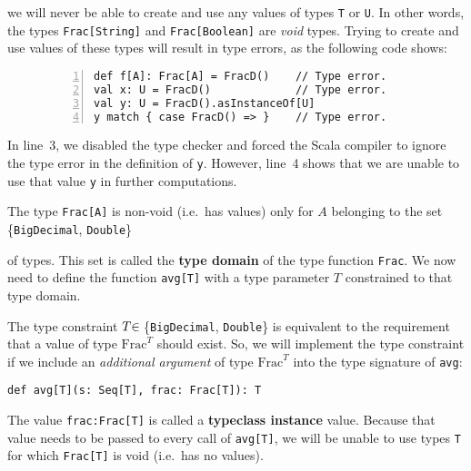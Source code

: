 \noindent we will never be able to create and use any values of types
\lstinline!T! or \lstinline!U!. In other words, the types \lstinline!Frac[String]!
and \lstinline!Frac[Boolean]! are \emph{void} types.
Trying to create and use values of these types will result in type
errors, as the following code shows:

\begin{wrapfigure}{l}{0.46\columnwidth}%
\vspace{-0.95\baselineskip}
\begin{lstlisting}[numbers=left,numberstyle={\small}]
def f[A]: Frac[A] = FracD()    // Type error.
val x: U = FracD()             // Type error.
val y: U = FracD().asInstanceOf[U]
y match { case FracD() => }    // Type error.
\end{lstlisting}

\vspace{-1.05\baselineskip}
\end{wrapfigure}%

\noindent In line~3, we disabled the type checker and forced the
Scala compiler to ignore the type error in the definition of \lstinline!y!.
However, line~4 shows that we are unable to use that value \lstinline!y!
in further computations.

The type \lstinline!Frac[A]! is non-void (i.e.~has values) only
for $A$ belonging to the set \{\lstinline!BigDecimal!, \lstinline!Double!\}
\begin{comment}
$\{\text{BigDecimal},\text{Double}\}$
\end{comment}
{} of types. This set is called the \textbf{type domain}
of the type function \lstinline!Frac!. We now need to define the
function \lstinline!avg[T]! with a type parameter $T$ constrained
to that type domain. 

The type constraint $T\negthickspace\in\:$\{\lstinline!BigDecimal!,
\lstinline!Double!\} is equivalent to the requirement that a value
of type $\text{Frac}^{T}$ should exist. So, we will implement the
type constraint if we include an \emph{additional argument} of type
$\text{Frac}^{T}$ into the type signature of \lstinline!avg!:
\begin{lstlisting}
def avg[T](s: Seq[T], frac: Frac[T]): T
\end{lstlisting}
The value \lstinline!frac:Frac[T]! is called a \textbf{typeclass
instance} value. Because that value needs to be passed to every call
of \lstinline!avg[T]!, we will be unable to use types \lstinline!T!
for which \lstinline!Frac[T]! is void (i.e.~has no values). 

